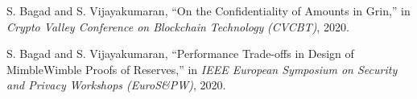\listofpublications

\begin{enumerate}[label={[\arabic*]}, leftmargin=\parindent, align=left, labelwidth=\parindent,labelsep=0pt]
    \item S. Bagad and S. Vijayakumaran, ``On the Confidentiality of Amounts in Grin,'' in \textit{Crypto Valley Conference on Blockchain Technology} \textit{(CVCBT)}, 2020.
    \item S. Bagad and S. Vijayakumaran, ``Performance Trade-offs in Design of MimbleWimble Proofs of Reserves,'' in \textit{IEEE European Symposium on Security and Privacy Workshops (EuroS\&PW)}, 2020.
\end{enumerate}

















